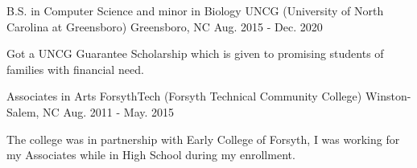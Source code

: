 

\begin{cventries}

  \cventry
    {B.S. in Computer Science and minor in Biology} %
    {UNCG (University of North Carolina at Greensboro)} %
    {Greensboro, NC} %
    {Aug. 2015 - Dec. 2020} %
    {
      \begin{cvitems} %
        \item {Got a UNCG Guarantee Scholarship which is given to promising students of families with financial need.}
      \end{cvitems}
    }
    
    
  \cventry
    {Associates in Arts} %
    {ForsythTech (Forsyth Technical Community College)} %
    {Winston-Salem, NC} %
    {Aug. 2011 - May. 2015} %
    {
      \begin{cvitems} %
        \item {The college was in partnership with Early College of Forsyth, I was working for my Associates while in High School during my enrollment.}
      \end{cvitems}
    }
    
    

\end{cventries}
